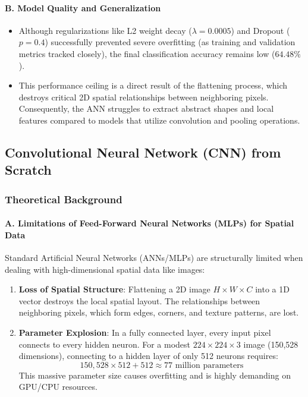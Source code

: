\documentclass[12pt,a4paper]{article}
\begin{document}
\paragraph{B. Model Quality and Generalization}
\begin{itemize}
    \item Although regularizations like L2 weight decay ($\lambda = 0.0005$) and Dropout ($p = 0.4$) successfully prevented severe overfitting (as training and validation metrics tracked closely), the final classification accuracy remains low ($64.48\%$).
    \item This performance ceiling is a direct result of the flattening process, which destroys critical 2D spatial relationships between neighboring pixels. Consequently, the ANN struggles to extract abstract shapes and local features compared to models that utilize convolution and pooling operations.
\end{itemize}

\subsection{Convolutional Neural Network (CNN) from Scratch}

\subsubsection{Theoretical Background}

\paragraph{A. Limitations of Feed-Forward Neural Networks (MLPs) for Spatial Data}
Standard Artificial Neural Networks (ANNs/MLPs) are structurally limited when dealing with high-dimensional spatial data like images:
\begin{enumerate}
    \item \textbf{Loss of Spatial Structure}: Flattening a 2D image $H \times W \times C$ into a 1D vector destroys the local spatial layout. The relationships between neighboring pixels, which form edges, corners, and texture patterns, are lost.
    \item \textbf{Parameter Explosion}: In a fully connected layer, every input pixel connects to every hidden neuron. For a modest $224 \times 224 \times 3$ image (150,528 dimensions), connecting to a hidden layer of only 512 neurons requires:
    \begin{equation}
        150,528 \times 512 + 512 \approx 77\text{ million parameters}
    \end{equation}
    This massive parameter size causes overfitting and is highly demanding on GPU/CPU resources.
\end{enumerate}
\end{document}
